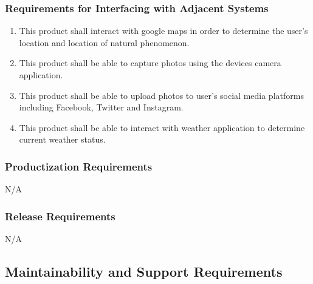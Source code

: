 \documentclass[]{article}
\begin{document}

\subsubsection{Requirements for Interfacing with Adjacent Systems}
\label{ssub:requirements_for_interfacing_with_adjacent_systems}
\begin{enumerate}[{OE}1. ]
	\item This product shall interact with google maps in order to determine the user's location and location of natural phenomenon.
	\item This product shall be able to capture photos using the devices camera application.
	\item This product shall be able to upload photos to user's social media platforms including Facebook, Twitter and Instagram.
	\item This product shall be able to interact with weather application to determine current weather status.
\end{enumerate}

\subsubsection{Productization Requirements}
\label{ssub:productization_requirements}
	
	N/A

\subsubsection{Release Requirements}
\label{ssub:release_requirements}
	 N/A



\subsection{Maintainability and Support Requirements}
\label{sub:maintainability_and_support_requirements}
\end{document}
